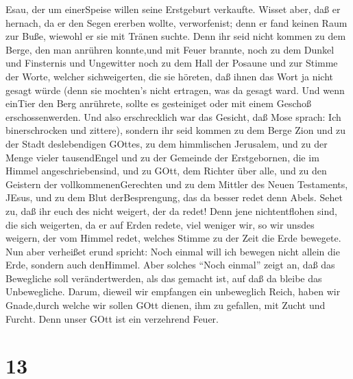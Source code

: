 Esau, der um einerSpeise willen seine Erstgeburt verkaufte.
 Wisset aber, daß er hernach, da er den Segen ererben
wollte, verworfenist; denn er fand keinen Raum zur Buße, wiewohl er sie
mit Tränen suchte.  Denn ihr seid nicht kommen zu dem
Berge, den man anrühren konnte,und mit Feuer brannte, noch zu dem Dunkel
und Finsternis und Ungewitter  noch zu dem Hall der Posaune
und zur Stimme der Worte, welcher sichweigerten, die sie höreten, daß
ihnen das Wort ja nicht gesagt würde  (denn sie mochten's
nicht ertragen, was da gesagt ward. Und wenn einTier den Berg anrührete,
sollte es gesteiniget oder mit einem Geschoß erschossenwerden.
 Und also erschrecklich war das Gesicht, daß Mose sprach:
Ich binerschrocken und zittere),  sondern ihr seid kommen
zu dem Berge Zion und zu der Stadt deslebendigen GOttes, zu dem
himmlischen Jerusalem, und zu der Menge vieler tausendEngel
 und zu der Gemeinde der Erstgebornen, die im Himmel
angeschriebensind, und zu GOtt, dem Richter über alle, und zu den
Geistern der vollkommenenGerechten  und zu dem Mittler des
Neuen Testaments, JEsus, und zu dem Blut derBesprengung, das da besser
redet denn Abels.  Sehet zu, daß ihr euch des nicht
weigert, der da redet! Denn jene nichtentflohen sind, die sich
weigerten, da er auf Erden redete, viel weniger wir, so wir unsdes
weigern, der vom Himmel redet,  welches Stimme zu der Zeit
die Erde bewegete. Nun aber verheißet erund spricht: Noch einmal will
ich bewegen nicht allein die Erde, sondern auch denHimmel. 
Aber solches ``Noch einmal'' zeigt an, daß das Bewegliche soll
verändertwerden, als das gemacht ist, auf daß da bleibe das
Unbewegliche.  Darum, dieweil wir empfangen ein unbeweglich
Reich, haben wir Gnade,durch welche wir sollen GOtt dienen, ihm zu
gefallen, mit Zucht und Furcht.  Denn unser GOtt ist ein
verzehrend Feuer.

\hypertarget{section-11}{%
\section{13}\label{section-11}}

